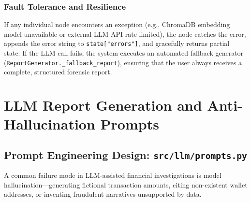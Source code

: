 \documentclass[11pt,a4paper]{report}
\begin{document}
\subsection{Fault Tolerance and Resilience}
If any individual node encounters an exception (e.g., ChromaDB embedding model unavailable or external LLM API rate-limited), the node catches the error, appends the error string to \texttt{state["errors"]}, and gracefully returns partial state. If the LLM call fails, the system executes an automated fallback generator (\texttt{ReportGenerator.\_fallback\_report}), ensuring that the user always receives a complete, structured forensic report.

\chapter{LLM Report Generation and Anti-Hallucination Prompts}

\section{Prompt Engineering Design: \texttt{src/llm/prompts.py}}
A common failure mode in LLM-assisted financial investigations is model hallucination---generating fictional transaction amounts, citing non-existent wallet addresses, or inventing fraudulent narratives unsupported by data.
\end{document}
